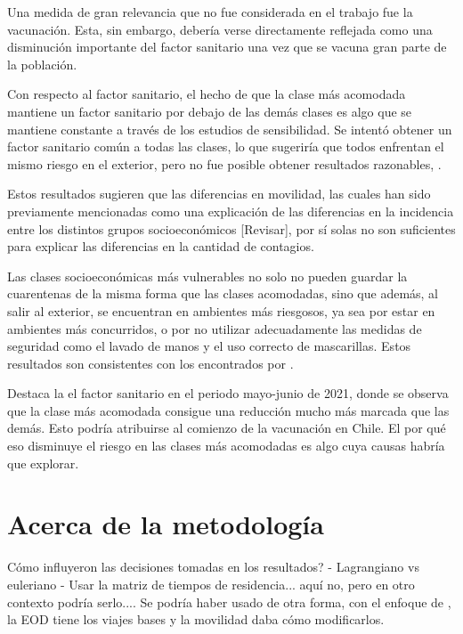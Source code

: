 Una medida de gran relevancia que no fue considerada en el trabajo fue la vacunación. Esta, sin embargo, debería verse directamente reflejada como una disminución importante del factor sanitario una vez que se vacuna gran parte de la población.

Con respecto al factor sanitario, el hecho de que la clase más acomodada mantiene un factor sanitario por debajo de las demás clases es algo que se mantiene constante a través de los estudios de sensibilidad. Se intentó obtener un factor sanitario común a todas las clases, lo que sugeriría que todos enfrentan el mismo riesgo en el exterior, pero no fue posible obtener resultados razonables, .

Estos resultados sugieren que las diferencias en movilidad, las cuales han sido previamente mencionadas como una explicación de las diferencias en la incidencia entre los distintos grupos socioeconómicos \cite{Mena2021}\cite{Gozzi2021} [Revisar], por sí solas no son suficientes para explicar las diferencias en la cantidad de contagios.

Las clases socioeconómicas más vulnerables no solo no pueden guardar la cuarentenas de la misma forma que las clases acomodadas, sino que además, al salir al exterior, se encuentran en ambientes más riesgosos, ya sea por estar en ambientes más concurridos, o por no utilizar adecuadamente las medidas de seguridad como el lavado de manos y el uso correcto de mascarillas. Estos resultados son consistentes con los encontrados por \cite{Chang2021}.

Destaca la el factor sanitario en el periodo mayo-junio de 2021, donde se observa que la clase más acomodada consigue una reducción mucho más marcada que las demás. Esto podría atribuirse al comienzo de la vacunación en Chile. El por qué eso disminuye el riesgo en las clases más acomodadas es algo cuya causas habría que explorar.




\section{Acerca de la metodología}

  

Cómo influyeron las decisiones tomadas en los resultados? 
- Lagrangiano vs euleriano 
- Usar la matriz de tiempos de residencia... aquí no, pero en otro contexto podría serlo.... Se podría haber usado de otra forma, con el enfoque de \cite{Chang2021}, la EOD tiene los viajes bases y la movilidad daba cómo modificarlos.

